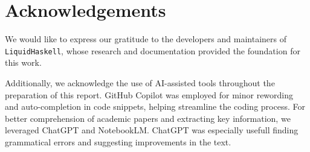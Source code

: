 \documentclass[]{rptuseminar}
\begin{document}
\section*{Acknowledgements}
We would like to express our gratitude to the developers and maintainers of \texttt{LiquidHaskell}, whose research and 
documentation provided the foundation for this work.

Additionally, we acknowledge the use of AI-assisted tools throughout the preparation of this report. 
GitHub Copilot was employed for minor rewording and auto-completion in code snippets, 
helping streamline the coding process. For better comprehension of academic papers and extracting key information, 
we leveraged ChatGPT and NotebookLM. ChatGPT was especially usefull finding grammatical errors and suggesting improvements in the text.
\newpage
\nocite{*}



\end{document}
